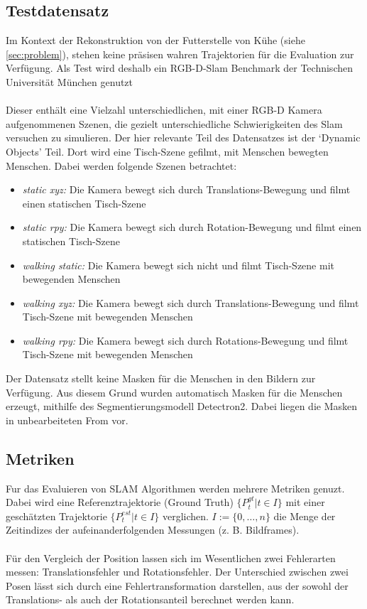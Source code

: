 \documentclass[12pt,DIV=15,BCOR=15mm,twoside,headsepline,abstract=true,listof=totoc,bibliography=totoc]{scrreprt}
\theoremstyle{remark}    %
\begin{document}
    \subsection{Testdatensatz}
    Im Kontext der Rekonstruktion von der Futterstelle von Kühe (siehe \ref{sec:problem}), stehen keine präsisen wahren Trajektorien für 
    die Evaluation zur Verfügung. Als Test wird deshalb ein \ac{RGB-D}-Slam Benchmark der Technischen Universität München genutzt \cite{sturm12iros}\\\\
    Dieser enthält eine Vielzahl unterschiedlichen, mit einer \ac{RGB-D} Kamera aufgenommenen Szenen, die gezielt unterschiedliche Schwierigkeiten
    des Slam versuchen zu simulieren. Der hier relevante Teil des Datensatzes ist der `Dynamic Objects' Teil. Dort wird eine Tisch-Szene gefilmt, mit Menschen
    bewegten Menschen. Dabei werden folgende Szenen betrachtet:
    \begin{itemize}
        \item \emph{static xyz:} Die Kamera bewegt sich durch Translations-Bewegung und filmt einen statischen Tisch-Szene
        \item \emph{static rpy:} Die Kamera bewegt sich durch Rotation-Bewegung und filmt einen statischen Tisch-Szene
        \item \emph{walking static:} Die Kamera bewegt sich nicht und filmt Tisch-Szene mit bewegenden Menschen
        \item \emph{walking xyz:} Die Kamera bewegt sich durch Translations-Bewegung und filmt Tisch-Szene mit bewegenden Menschen
        \item \emph{walking rpy:} Die Kamera bewegt sich durch Rotations-Bewegung und filmt Tisch-Szene mit bewegenden Menschen
    \end{itemize}
    Der Datensatz stellt keine Masken für die Menschen in den Bildern zur Verfügung. Aus diesem Grund wurden automatisch Masken für die Menschen erzeugt, mithilfe des 
    Segmentierungsmodell Detectron2. \cite{wu2019detectron2} Dabei liegen die Masken in unbearbeiteten From vor.

    \subsection{Metriken}
    Fur das Evaluieren von \ac{SLAM} Algorithmen werden mehrere Metriken genuzt. Dabei wird eine Referenztrajektorie (Ground Truth) $\{P^{gt}_t| t \in I\}$ 
    mit einer geschätzten Trajektorie $\{P^{est}_t| t \in I\}$ verglichen. $I:= \{0, \ldots, n\}$ die Menge der Zeitindizes der aufeinanderfolgenden Messungen 
    (z. B. Bildframes). \\\\
    Für den Vergleich der Position lassen sich im Wesentlichen zwei Fehlerarten messen: Translationsfehler und Rotationsfehler.
    Der Unterschied zwischen zwei Posen lässt sich durch eine Fehlertransformation darstellen, aus der sowohl der Translations- als auch 
    der Rotationsanteil berechnet werden kann.
\end{document}
